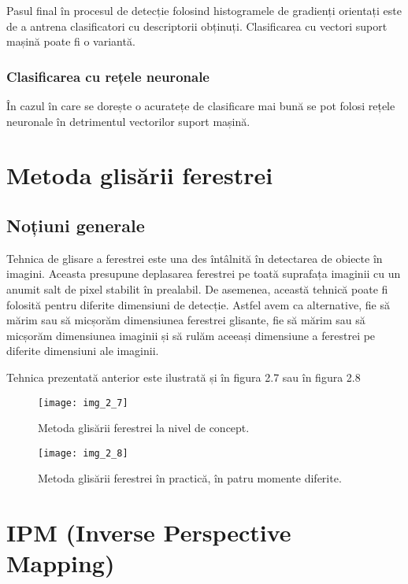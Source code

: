 Pasul final în procesul de detecție folosind histogramele de gradienți orientați este de a antrena clasificatori cu descriptorii obținuți. Clasificarea cu vectori suport mașină poate fi o variantă.

\subsubsection {Clasificarea cu rețele neuronale}

În cazul în care se dorește o acuratețe de clasificare mai bună se pot folosi rețele neuronale în detrimentul vectorilor suport mașină.

\section{Metoda glisării ferestrei}

\subsection{Noțiuni generale}

Tehnica de glisare a ferestrei este una des întâlnită în detectarea de obiecte în imagini. Aceasta presupune deplasarea ferestrei pe toată suprafața imaginii cu un anumit salt de pixel stabilit în prealabil. De asemenea, această tehnică poate fi folosită pentru diferite dimensiuni de detecție. Astfel avem ca alternative, fie să mărim sau să micșorăm dimensiunea ferestrei glisante, fie să mărim sau să micșorăm dimensiunea imaginii și să rulăm aceeași dimensiune a ferestrei pe diferite dimensiuni ale imaginii.

Tehnica prezentată anterior este ilustrată și în figura 2.7 sau în figura 2.8
\begin{figure}[!h]
	\centering
	\texttt{[image: img\_2\_7]}
	\caption{Metoda glisării ferestrei la nivel de concept.}
	\label{fig:nonfloat}
\end{figure}
\begin{figure}[!h]
	\centering
	\texttt{[image: img\_2\_8]}
	\caption{Metoda glisării ferestrei în practică, în patru momente diferite.}
	\label{fig:nonfloat}
\end{figure}

\section{IPM (Inverse Perspective Mapping)}

